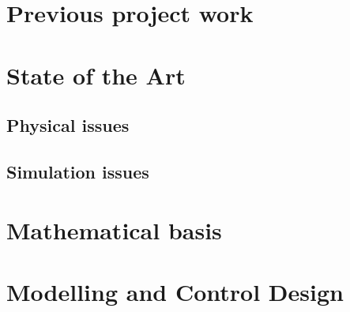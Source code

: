 \documentclass[class=article, crop=false, draft=true]{standalone}
\begin{document}
\section{Previous project work}

\section{State of the Art}
\subsection{Physical issues}
\subsection{Simulation issues}

\section{Mathematical basis}

\section{Modelling and Control Design}
\end{document}

